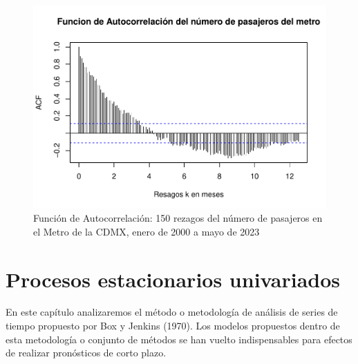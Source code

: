 \documentclass[
]{book}
\newenvironment{Shaded}{\begin{snugshade}}{\end{snugshade}}
\newcommand{\AttributeTok}[1]{\textcolor[rgb]{0.13,0.29,0.53}{#1}}
\newcommand{\DecValTok}[1]{\textcolor[rgb]{0.00,0.00,0.81}{#1}}
\newcommand{\FunctionTok}[1]{\textcolor[rgb]{0.13,0.29,0.53}{\textbf{#1}}}
\newcommand{\NormalTok}[1]{#1}
\newcommand{\OtherTok}[1]{\textcolor[rgb]{0.56,0.35,0.01}{#1}}
\newcommand{\SpecialCharTok}[1]{\textcolor[rgb]{0.81,0.36,0.00}{\textbf{#1}}}
\newcommand{\StringTok}[1]{\textcolor[rgb]{0.31,0.60,0.02}{#1}}
\begin{document}
\begin{Shaded}
\end{Shaded}

\begin{figure}

{\centering \includegraphics{Notas-Series-Tiempo_files/figure-latex/fig33-1} 

}

\caption{Función de Autocorrelación: 150 rezagos del número de pasajeros en el Metro de la CDMX, enero de 2000 a mayo de 2023}\label{fig:fig33}
\end{figure}

\hypertarget{procesos-estacionarios-univariados}{%
\section{Procesos estacionarios univariados}\label{procesos-estacionarios-univariados}}

En este capítulo analizaremos el método o metodología de análisis de series de tiempo propuesto por Box y Jenkins (1970). Los modelos
propuestos dentro de esta metodología o conjunto de métodos se han vuelto indispensables para efectos de realizar pronósticos de corto
plazo.
\end{document}
